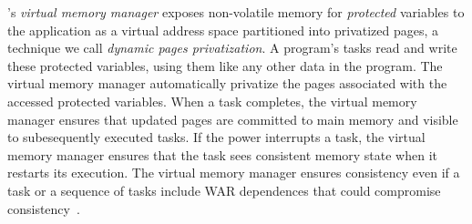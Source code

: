 %
\sys's {\em virtual memory manager} exposes non-volatile memory for
\emph{protected} variables to the application as a virtual address space
partitioned into privatized pages, a technique we call \emph{dynamic pages privatization}.
%
A program's tasks read and write these protected variables, using them like any
other data in the program.
%
The virtual memory manager automatically privatize the pages associated with the accessed protected variables.
%
When a task completes, the virtual memory manager ensures that updated pages
are committed to main memory and visible to subesequently executed tasks.
%
If the power interrupts a task, the virtual memory manager ensures that
the task sees consistent memory state when it restarts its execution.
%
The virtual memory manager ensures consistency even if a task or a sequence of tasks include WAR dependences that could compromise consistency~\cite{ratchet,dino}.

